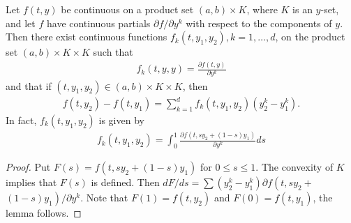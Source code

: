 \documentclass{article}
\begin{document}
\begin{lema}\label{lem:3.1fadtahj}
Let $f(t, y)$ be continuous on a product set $(a, b) \times K$, where $K$ is an  $y$-set, and let $f$ have continuous partials $\partial f / \partial y^{k}$ with respect to the components of $y$. Then there exist continuous functions $f_{k}\left(t, y_{1}, y_{2}\right), k=1, \ldots, d$, on the product set $(a, b) \times K \times K$ such that
\begin{align}
f_{k}(t, y, y)=\frac{\partial f(t, y)}{\partial y^{k}}\label{eq:3.6acfd}
\end{align}
and that if $\left(t, y_{1}, y_{2}\right) \in(a, b) \times K \times K$, then
\begin{align*}
f\left(t, y_{2}\right)-f\left(t, y_{1}\right)=\sum_{k=1}^{d} f_{k}\left(t, y_{1}, y_{2}\right)\left(y_{2}^{k}-y_{1}^{k}\right) .
\end{align*}
In fact, $f_{k}\left(t, y_{1}, y_{2}\right)$ is given by
\begin{align*}
f_{k}\left(t, y_{1}, y_{2}\right)=\int_{0}^{1} \frac{\partial f\left(t, s y_{2}+(1-s) y_{1}\right)}{\partial y^{k}} d s
\end{align*}
\end{lema} 
\begin{proof}
Put $F(s)=f\left(t, s y_{2}+(1-s) y_{1}\right)$ for $0 \le s \le 1$. The convexity of $K$ implies that $F(s)$ is defined. Then $d F / d s=\sum\left(y_{2}^{k}-y_{1}^{k}\right) \partial f\left(t, s y_{2}+\right.$ $\left.(1-s) y_{1}\right) / \partial y^{k}$. Note that $F(1)=f\left(t, y_{2}\right)$ and $F(0)=f\left(t, y_{1}\right)$, the lemma follows.
\end{proof}
\end{document}
